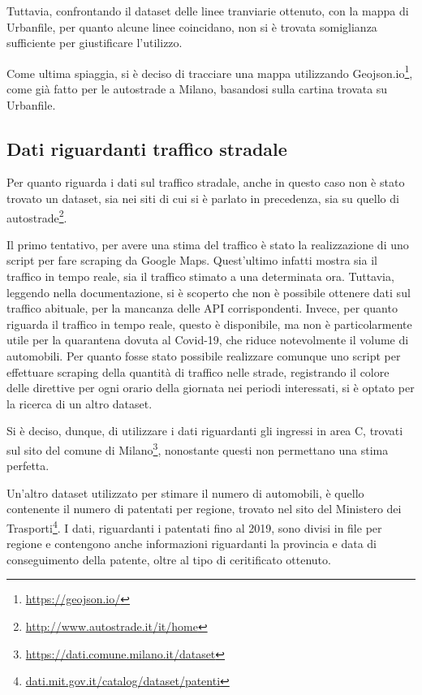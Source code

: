 \documentclass[a4paper,12pt]{report}
\begin{document}
Tuttavia, confrontando il dataset delle linee tranviarie ottenuto, 
con la mappa di Urbanfile, per quanto alcune linee coincidano, non si è trovata 
somiglianza sufficiente per giustificare l'utilizzo.

Come ultima spiaggia, si è deciso di tracciare una mappa utilizzando 
Geojson.io\footnote{\url{https://geojson.io/}}, come già fatto per le autostrade a Milano, 
basandosi sulla cartina trovata su Urbanfile. 

\subsection{Dati riguardanti traffico stradale}

Per quanto riguarda i dati sul traffico stradale, anche in questo caso non è stato trovato un 
dataset, sia nei siti di cui si è parlato in precedenza, sia su quello di 
autostrade\footnote{\url{http://www.autostrade.it/it/home}}.

Il primo tentativo, per avere una stima del traffico è stato la realizzazione di uno 
script per fare scraping da Google Maps. 
Quest'ultimo infatti mostra sia il traffico in tempo reale, sia 
il traffico stimato a una determinata ora. 
Tuttavia, leggendo nella documentazione, si è scoperto che non è possibile ottenere 
dati sul traffico abituale, per la mancanza delle API corrispondenti. 
Invece, per quanto riguarda il traffico in tempo 
reale, questo è disponibile, ma non è particolarmente utile per la quarantena dovuta al 
Covid-19, che riduce notevolmente il volume di automobili. 
Per quanto fosse stato possibile realizzare comunque uno script per effettuare scraping della 
quantità di traffico nelle strade, registrando il colore delle direttive per ogni orario della 
giornata nei periodi interessati, si è optato per la ricerca di un altro dataset.

Si è deciso, dunque, di utilizzare i dati riguardanti gli ingressi in area C, 
trovati sul sito del comune di Milano\footnote{\url{https://dati.comune.milano.it/dataset}}, 
nonostante questi non permettano una stima perfetta.

Un'altro dataset utilizzato per stimare il numero di automobili, è quello contenente 
il numero di patentati per regione, trovato nel sito del Ministero dei 
Trasporti\footnote{\url{dati.mit.gov.it/catalog/dataset/patenti}}.
I dati, riguardanti i patentati fino al 2019, sono divisi in file per regione e 
contengono anche informazioni riguardanti la provincia e data di conseguimento della 
patente, oltre al tipo di ceritificato ottenuto.
\end{document}
